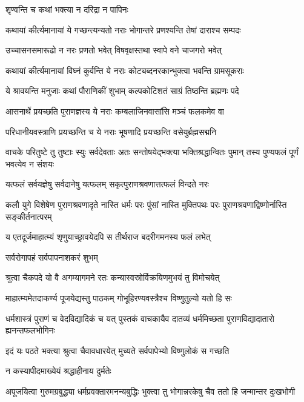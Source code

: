 \onelineshloka
{शृण्वन्ति च कथां भक्त्या न दरिद्रा न पापिनः} %

\twolineshloka
{कथायां कीर्त्यमानायां ये गच्छन्त्यन्यतो नराः}
{भोगान्तरे प्रणश्यन्ति तेषां दाराश्च सम्पदः} %

\twolineshloka
{उच्चासनसमारूढो न नरः प्रणतो भवेत्}
{विषवृक्षस्तथा स्वापे वने चाजगरो भवेत्} %

\twolineshloka
{कथायां कीर्त्यमानायां विघ्नं कुर्वन्ति ये नराः}
{कोट्यब्दनरकान्भुक्त्वा भवन्ति ग्रामसूकराः} %

\twolineshloka
{ये श्रावयन्ति मनुजाः कथां पौराणिकीं शुभाम्}
{कल्पकोटिशतं साग्रं तिष्ठन्ति ब्रह्मणः पदे} %

\twolineshloka
{आसनार्थे प्रयच्छति पुराणज्ञस्य ये नराः}
{कम्बलाजिनवासांसि मञ्चं फलकमेव वा} %

\twolineshloka
{परिधानीयवस्त्राणि प्रयच्छन्ति च ये नराः}
{भूषणादि प्रयच्छन्ति वसेयुर्ब्रह्मसद्मनि} %

\threelineshloka
{वाचके परितुष्टे तु तुष्टाः स्युः सर्वदेवताः}
{अतः सन्तोषयेद्भक्त्या भक्तिश्रद्धान्वितः पुमान्}
{तस्य पुण्यफलं पूर्णं भवत्येव न संशयः} %

\twolineshloka
{यत्फलं सर्वयज्ञेषु सर्वदानेषु यत्फलम्}
{सकृत्पुराणश्रवणात्तत्फलं विन्दते नरः} %

\threelineshloka
{कलौ युगे विशेषेण पुराणश्रवणादृते}
{नास्ति धर्मः परः पुंसां नास्ति मुक्तिपथः परः}
{पुराणश्रवणाद्विष्णोर्नास्ति सङ्कीर्तनात्परम्} %

\twolineshloka
{य एतदूर्जमाहात्म्यं शृणुयाच्छ्रावयेदपि}
{स तीर्थराज बदरीगमनस्य फलं लभेत्} %


\onelineshloka
{सर्वरोगापहं सर्वपापनाशकरं शुभम्} %

\twolineshloka
{श्रुत्वा चैकपदे यो वै अगम्यागमने रतः}
{कन्यास्वस्रोर्विक्रयिणमुभयं तु विमोचयेत्} %

\twolineshloka
{माहात्म्यमेतदाकर्ण्य पूजयेद्यस्तु पाठकम्}
{गोभूहिरण्यवस्त्रैश्च विष्णुतुल्यो यतो हि सः} %

\threelineshloka
{धर्मशास्त्रं पुराणं च वेदविद्यादिकं च यत्}
{पुस्तकं वाचकायैव दातव्यं धर्ममिच्छता}
{पुराणविद्यादातारो ह्यनन्तफलभोगिनः} %

\twolineshloka
{इदं यः पठते भक्त्या श्रुत्वा चैवावधारयेत्}
{मुच्यते सर्वपापेभ्यो विष्णुलोकं स गच्छति} %


\onelineshloka
{न कस्यापीदमाख्येयं श्रद्धाहीनाय दुर्मतेः} %

\twolineshloka
{अपूजयित्वा गुरुमग्रबुद्ध्या धर्मप्रवक्तारमनन्यबुद्धिः}
{भुक्त्वा तु भोगान्नरकेषु चैव ततो हि जन्मान्तर दुःखभोगी} %

